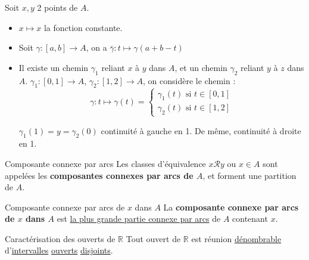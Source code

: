 \begin{myproof}
Soit $x,y$ 2 points de $A$.
\begin{itemize}
    \item $x \mapsto x$ la fonction constante.
    \item Soit $\gamma: [a,b] \to A$, on a $\bar \gamma : t \mapsto \gamma(a+b-t)$
    \item Il existe un chemin $\gamma_1$ reliant $x$ à $y$ dans  $A$, et un chemin $\gamma_2$ reliant $y$ à  $z$ dans  $A$.  $\gamma_1:[0,1] \to A$, $\gamma_2:[1,2]\to A$, on considère le chemin :
        \[
        \gamma : t \mapsto \gamma(t) = \begin{cases}
            \gamma_1(t) \text{ si } t \in [0,1]\\
            \gamma_2(t) \text{ si } t \in [1,2]
        \end{cases}
        \]

        $\gamma_1(1) = y = \gamma_2(0)$ continuité à gauche en 1. De même, continuité à droite en 1.
        
\end{itemize}
\end{myproof}

\begin{Definition}[colbacktitle=red!75!black]{Composante connexe par arcs}{}
Les classes d'équivalence $x \mathcal{R}y$ ou $x\in A$ sont appelées les \textbf{composantes connexes par arcs de $A$}, et forment une partition de $A$.
\end{Definition}


\begin{Definition}[colbacktitle=red!75!black]{Composante connexe par arcs de $x$ dans $A$}{}
La \textbf{composante connexe par arcs de $x$ dans $A$} est \underline{la plus grande partie connexe par arcs} de $A$ contenant $x$.
\end{Definition}

\begin{Prop}{Caractérisation des ouverts de $\mathbb{R}$}{}
Tout ouvert de $\mathbb{R}$ est réunion \underline{dénombrable} d'\underline{intervalles} \underline{ouverts} \underline{disjoints}.
\end{Prop}

